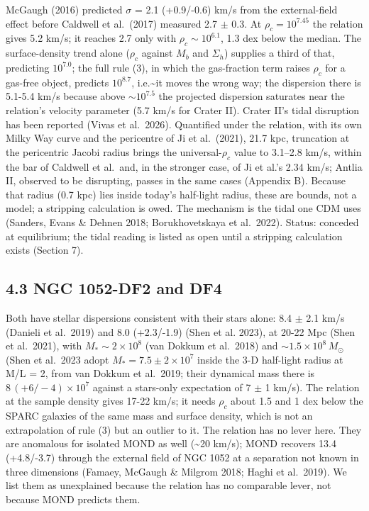 \documentclass[
  10pt,
]{article}
\begin{document}
McGaugh (2016) predicted $\sigma$ = 2.1 (+0.9/-0.6) km/s from the external-field effect before Caldwell et al.~(2017) measured 2.7 $\pm$ 0.3. At $\rho_c=10^{7.45}$ the relation gives 5.2 km/s; it reaches 2.7 only with $\rho_c\sim 10^{6.1}$, 1.3 dex below the median. The surface-density trend alone ($\rho_c$ against $M_b$ and $\Sigma_h$) supplies a third of that, predicting $10^{7.0}$; the full rule (3), in which the gas-fraction term raises $\rho_c$ for a gas-free object, predicts $10^{8.7}$, i.e.\textasciitilde{}it moves the wrong way; the dispersion there is 5.1-5.4 km/s because above $\sim 10^{7.5}$ the projected dispersion saturates near the relation's velocity parameter (5.7 km/s for Crater II). Crater II's tidal disruption has been reported (Vivas et al.~2026). Quantified under the relation, with its own Milky Way curve and the pericentre of Ji et al.~(2021), 21.7 kpc, truncation at the pericentric Jacobi radius brings the universal-$\rho_c$ value to 3.1--2.8 km/s, within the bar of Caldwell et al.\ and, in the stronger case, of Ji et al.'s 2.34 km/s; Antlia II, observed to be disrupting, passes in the same cases (Appendix B). Because that radius (0.7 kpc) lies inside today's half-light radius, these are bounds, not a model; a stripping calculation is owed. The mechanism is the tidal one CDM uses (Sanders, Evans \& Dehnen 2018; Borukhovetskaya et al.~2022). Status: conceded at equilibrium; the tidal reading is listed as open until a stripping calculation exists (Section 7).

\subsection{4.3 NGC 1052-DF2 and DF4}

Both have stellar dispersions consistent with
their stars alone: 8.4 $\pm$ 2.1 km/s (Danieli et al.~2019) and 8.0
(+2.3/-1.9) (Shen et al. 2023), at 20-22 Mpc (Shen et al.~2021), with
$M_*\sim 2\times10^8$ (van Dokkum et al.~2018) and
$\sim1.5\times10^8\,M_\odot$ (Shen et al.~2023 adopt $M_*=7.5\pm2\times10^7$ inside the 3-D half-light radius at M/L = 2, from van Dokkum et
al.~2019; their dynamical mass there is $8\,(+6/-4)\times10^7$ against a
stars-only expectation of 7 $\pm$ 1 km/s). The relation at the sample density gives 17-22 km/s; it
needs $\rho_c$ about 1.5 and 1 dex below the SPARC galaxies of the same
mass and surface density, which is not an extrapolation of rule (3)
but an outlier to it. The relation has no lever here. They are anomalous for
isolated MOND as well (\textasciitilde{}20 km/s); MOND recovers 13.4
(+4.8/-3.7) through the external field of NGC 1052 at a separation not
known in three dimensions (Famaey, McGaugh \& Milgrom 2018; Haghi et
al.~2019). We list them as unexplained because the relation has no comparable
lever, not because MOND predicts them.
\end{document}
